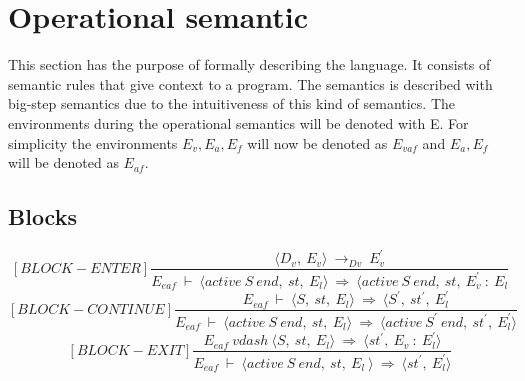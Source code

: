 \section{Operational semantic}
This section has the purpose of formally describing the language. It consists of semantic rules that give context to a program. \newline
The semantics is described with big-step semantics due to the intuitiveness of this kind of semantics. \newline
The environments during the operational semantics will be denoted with E. For simplicity the environments \begin{math} E_v, E_a, E_f \end{math} will now be denoted as \begin{math} E_{vaf} \end{math} and \begin{math} E_a, E_f \end{math} will be denoted as \begin{math} E_{af} \end{math}.

\subsection{Blocks}
\[	
[BLOCK-ENTER]	
\dfrac{\langle D_v, \ E_v \rangle \ \rightarrow_{Dv} \ E_v^{'}}{E_{eaf} \ \vdash \ \langle active \ S \ end, \ st, \ E_l \rangle \ \Rightarrow \ \langle active \ S \ end, \ st, \ E_v^{'} \ : \ E_l}	
\]
\[	
[BLOCK-CONTINUE]	
\dfrac{E_{eaf} \ \vdash \ \langle S, \ st, \ E_l \rangle \ \Rightarrow \ \langle S^{'}, \ st^{'}, \ E_l^{'}}{E_{eaf} \ \vdash \ \langle active \ S \ end, \ st, \ E_l \rangle \ \Rightarrow \ \langle active \ S^{'} \ end, \ st^{'}, \ E_l^{'} \rangle}	
\]
\[	
[BLOCK-EXIT]	
\dfrac{E_{eaf} \ vdash \ \langle S, \ st, \ E_l \rangle \ \Rightarrow \ \langle st^{'}, \ E_v \ : \ E_l^{'} \rangle}{E_{eaf} \ \vdash \ \langle active \ S \ end, \ st, \ E_l \ \rangle \ \Rightarrow \ \langle st^{'}, \ E_l^{'} \rangle}	
\]

